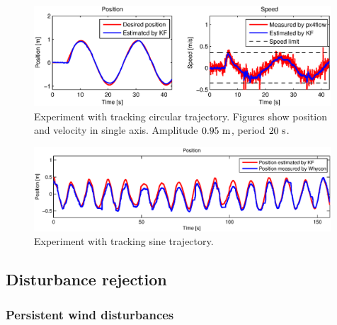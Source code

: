 \begin{figure}[H]
\centering
\includegraphics[width=0.99\textwidth]{fig/experiment1_sine.eps}
\caption{Experiment with tracking circular trajectory. Figures show position and velocity in single axis. Amplitude $0.95~\mathrm{m}$, period $20~\mathrm{s}$.}
\label{fig:experiment_sine_1}
\end{figure}

\begin{figure}[H]
\centering
\includegraphics[width=0.99\textwidth]{fig/experiment5_drift_sine.eps}
\caption{Experiment with tracking sine trajectory.}
\label{fig:experiment_drift_sine}
\end{figure}

\subsection{Disturbance rejection}

\subsubsection{Persistent wind disturbances}

